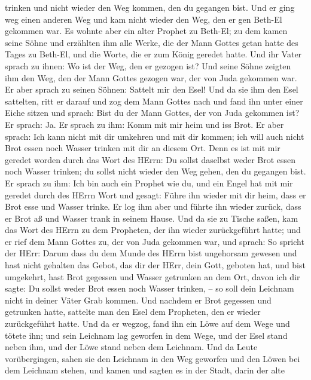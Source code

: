 trinken und nicht wieder den Weg kommen, den du gegangen bist.
 Und er ging weg einen anderen Weg und kam nicht wieder den
Weg, den er gen Beth-El gekommen war.  Es wohnte aber ein
alter Prophet zu Beth-El; zu dem kamen seine Söhne und erzählten ihm
alle Werke, die der Mann Gottes getan hatte des Tages zu Beth-El, und
die Worte, die er zum König geredet hatte.  Und ihr Vater
sprach zu ihnen: Wo ist der Weg, den er gezogen ist? Und seine Söhne
zeigten ihm den Weg, den der Mann Gottes gezogen war, der von Juda
gekommen war.  Er aber sprach zu seinen Söhnen: Sattelt mir
den Esel! Und da sie ihm den Esel sattelten, ritt er darauf
 und zog dem Mann Gottes nach und fand ihn unter einer
Eiche sitzen und sprach: Bist du der Mann Gottes, der von Juda gekommen
ist? Er sprach: Ja.  Er sprach zu ihm: Komm mit mir heim
und iss Brot.  Er aber sprach: Ich kann nicht mit dir
umkehren und mit dir kommen; ich will auch nicht Brot essen noch Wasser
trinken mit dir an diesem Ort.  Denn es ist mit mir geredet
worden durch das Wort des HErrn: Du sollst daselbst weder Brot essen
noch Wasser trinken; du sollst nicht wieder den Weg gehen, den du
gegangen bist.  Er sprach zu ihm: Ich bin auch ein Prophet
wie du, und ein Engel hat mit mir geredet durch des HErrn Wort und
gesagt: Führe ihn wieder mit dir heim, dass er Brot esse und Wasser
trinke. Er log ihm aber  und führte ihn wieder zurück, dass
er Brot aß und Wasser trank in seinem Hause.  Und da sie zu
Tische saßen, kam das Wort des HErrn zu dem Propheten, der ihn wieder
zurückgeführt hatte;  und er rief dem Mann Gottes zu, der
von Juda gekommen war, und sprach: So spricht der HErr: Darum dass du
dem Munde des HErrn bist ungehorsam gewesen und hast nicht gehalten das
Gebot, das dir der HErr, dein Gott, geboten hat,  und bist
umgekehrt, hast Brot gegessen und Wasser getrunken an dem Ort, davon ich
dir sagte: Du sollst weder Brot essen noch Wasser trinken, -- so soll
dein Leichnam nicht in deiner Väter Grab kommen.  Und
nachdem er Brot gegessen und getrunken hatte, sattelte man den Esel dem
Propheten, den er wieder zurückgeführt hatte.  Und da er
wegzog, fand ihn ein Löwe auf dem Wege und tötete ihn; und sein Leichnam
lag geworfen in dem Wege, und der Esel stand neben ihm, und der Löwe
stand neben dem Leichnam.  Und da Leute vorübergingen,
sahen sie den Leichnam in den Weg geworfen und den Löwen bei dem
Leichnam stehen, und kamen und sagten es in der Stadt, darin der alte
